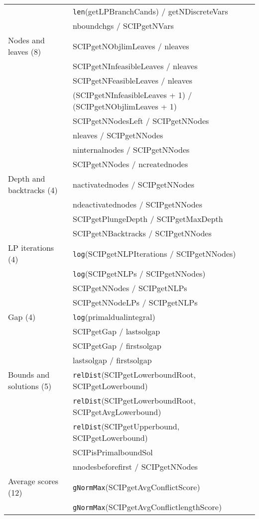\documentclass[letterpaper]{article} %
\begin{document}
\begin{center}
\begin{footnotesize}
\begin{longtable}{ll}
& \texttt{len}(getLPBranchCands) / getNDiscreteVars\\
& nboundchgs / SCIPgetNVars\\
Nodes and leaves (8) & SCIPgetNObjlimLeaves / nleaves\\
& SCIPgetNInfeasibleLeaves / nleaves\\
& SCIPgetNFeasibleLeaves / nleaves\\
& (SCIPgetNInfeasibleLeaves + 1) / (SCIPgetNObjlimLeaves + 1)\\
& SCIPgetNNodesLeft / SCIPgetNNodes \\
& nleaves / SCIPgetNNodes\\
& ninternalnodes / SCIPgetNNodes \\
& SCIPgetNNodes / ncreatednodes \\
Depth and backtracks (4) & nactivatednodes / SCIPgetNNodes\\
& ndeactivatednodes / SCIPgetNNodes \\
& SCIPgetPlungeDepth / SCIPgetMaxDepth \\
& SCIPgetNBacktracks / SCIPgetNNodes \\
LP iterations (4) & \texttt{log}(SCIPgetNLPIterations / SCIPgetNNodes)\\
& \texttt{log}(SCIPgetNLPs / SCIPgetNNodes)\\
& SCIPgetNNodes / SCIPgetNLPs \\
& SCIPgetNNodeLPs / SCIPgetNLPs \\
Gap (4) & \texttt{log}(primaldualintegral)\\
& SCIPgetGap / lastsolgap \\
& SCIPgetGap / firstsolgap \\
& lastsolgap / firstsolgap \\
Bounds and solutions (5) & \texttt{relDist}(SCIPgetLowerboundRoot, SCIPgetLowerbound)\\
& \texttt{relDist}(SCIPgetLowerboundRoot, SCIPgetAvgLowerbound) \\
& \texttt{relDist}(SCIPgetUpperbound, SCIPgetLowerbound)\\
& SCIPisPrimalboundSol \\
& nnodesbeforefirst / SCIPgetNNodes \\
Average scores (12) & \texttt{gNormMax}(SCIPgetAvgConflictScore) \\
& \texttt{gNormMax}(SCIPgetAvgConflictlengthScore) \\

\end{longtable}
\end{footnotesize}
\end{center}
\end{document}
